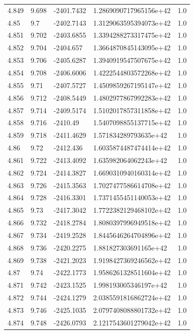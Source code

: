 \begin{tabular}{lllll}
4.849 & 9.698 & -2401.7432 & 1.2869090717965156e+42 & 1.0 \\
4.85 & 9.7 & -2402.7143 & 1.3129063595394073e+42 & 1.0 \\
4.851 & 9.702 & -2403.6855 & 1.3394288273317475e+42 & 1.0 \\
4.852 & 9.704 & -2404.657 & 1.3664870845143095e+42 & 1.0 \\
4.853 & 9.706 & -2405.6287 & 1.3940919547507675e+42 & 1.0 \\
4.854 & 9.708 & -2406.6006 & 1.4222544803572268e+42 & 1.0 \\
4.855 & 9.71 & -2407.5727 & 1.4509859267195147e+42 & 1.0 \\
4.856 & 9.712 & -2408.5449 & 1.4802977867992283e+42 & 1.0 \\
4.857 & 9.714 & -2409.5174 & 1.5102017857311858e+42 & 1.0 \\
4.858 & 9.716 & -2410.49 & 1.5407098855137715e+42 & 1.0 \\
4.859 & 9.718 & -2411.4629 & 1.571834289793635e+42 & 1.0 \\
4.86 & 9.72 & -2412.436 & 1.6035874487474414e+42 & 1.0 \\
4.861 & 9.722 & -2413.4092 & 1.635982064062243e+42 & 1.0 \\
4.862 & 9.724 & -2414.3827 & 1.6690310940160314e+42 & 1.0 \\
4.863 & 9.726 & -2415.3563 & 1.7027477586614708e+42 & 1.0 \\
4.864 & 9.728 & -2416.3301 & 1.7371455451140053e+42 & 1.0 \\
4.865 & 9.73 & -2417.3042 & 1.7722382129468102e+42 & 1.0 \\
4.866 & 9.732 & -2418.2784 & 1.8080397996949518e+42 & 1.0 \\
4.867 & 9.734 & -2419.2528 & 1.8445646264704896e+42 & 1.0 \\
4.868 & 9.736 & -2420.2275 & 1.881827303691165e+42 & 1.0 \\
4.869 & 9.738 & -2421.2023 & 1.9198427369246562e+42 & 1.0 \\
4.87 & 9.74 & -2422.1773 & 1.9586261328511604e+42 & 1.0 \\
4.871 & 9.742 & -2423.1525 & 1.998193005346197e+42 & 1.0 \\
4.872 & 9.744 & -2424.1279 & 2.0385591816862724e+42 & 1.0 \\
4.873 & 9.746 & -2425.1035 & 2.0797408088801732e+42 & 1.0 \\
4.874 & 9.748 & -2426.0793 & 2.1217543601279042e+42 & 1.0 \\

\end{tabular}
